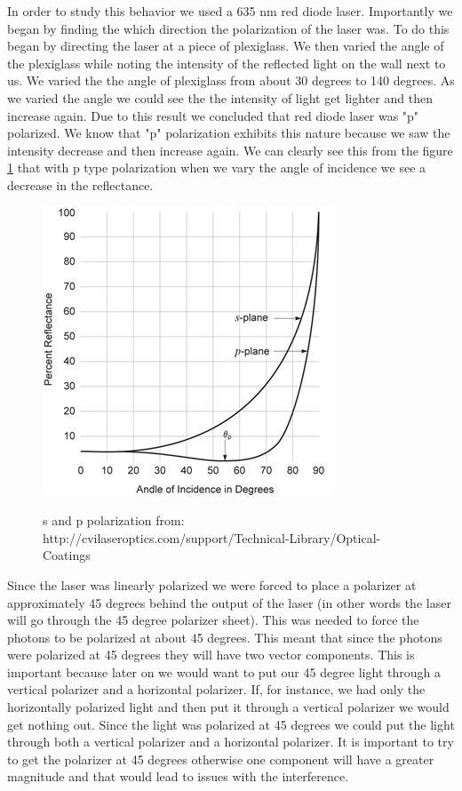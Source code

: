 \documentclass[12pt letterpaper]{article}
\begin{document}
In order to study this behavior we used a 635 nm red diode laser. Importantly we began by finding the which direction the polarization of the laser was. To do this began by directing the laser at a piece of plexiglass. We then varied the angle of the plexiglass  while noting the intensity of the reflected light on the wall next to us. We varied the the angle of plexiglass from about 30 degrees to 140 degrees. As we varied the angle we could see the the intensity of light get lighter and then increase again. Due to this result we concluded that red diode laser was "p" polarized. We know that "p" polarization exhibits this nature because we saw the intensity decrease and then increase again. We can clearly see this from the figure \ref{fig:s_and_p} that with p type polarization when we vary the angle of incidence we see a decrease in the reflectance. 

\begin{figure}[!ht]
  \caption{s and p polarization from: http://cvilaseroptics.com/support/Technical-Library/Optical-Coatings  }
  \centering
    \includegraphics[width=.5\textwidth]{s_and_p_polarization.jpg}
    \label{fig:s_and_p}
\end{figure}

Since the laser was linearly polarized we were forced to place a polarizer at approximately 45 degrees behind the output of the laser (in other words the laser will go through the 45 degree polarizer sheet). This was needed to force the photons to be polarized at about 45 degrees. This meant that since the photons were polarized at 45 degrees they will have two vector components. This is important because later on we would want to put our 45 degree light through a vertical polarizer and a horizontal polarizer. If, for instance, we had only the horizontally polarized light and then put it through a vertical polarizer we would get nothing out. Since the light was polarized at 45 degrees we could put the light through both a vertical polarizer and a horizontal polarizer. It is important to try to get the polarizer at 45 degrees otherwise one component will have  a greater magnitude and that would lead to issues with the interference. 
\end{document}
